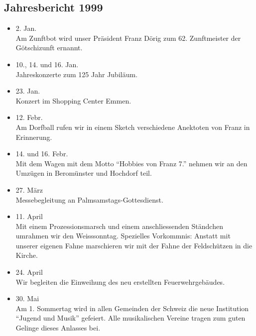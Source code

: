 \subsection{Jahresbericht 1999}

\begin{history}


    \begin{itemize}

        \item[]2. Jan.\\
        Am Zunftbot wird unser Präsident Franz Dörig zum 62. Zunftmeister der
        Götschizunft ernannt.

        \item[]10., 14. und 16. Jan.\\
        Jahreskonzerte zum 125 Jahr Jubiläum.

        \item[]23. Jan.\\
        Konzert im Shopping Center Emmen.

        \item[]12. Febr.\\
        Am Dorfball rufen wir in einem Sketch verschiedene Anektoten von Franz
        in Erinnerung.

        \item[]14. und 16. Febr.\\
        Mit dem Wagen mit dem Motto \enquote{Hobbies von Franz 7.} nehmen wir an
        den Umzügen in Beromünster und Hochdorf teil.

        \item[]27. März\\
        Messebegleitung an Palmsamstags-Gottesdienst.

        \item[]11. April\\
        Mit einem Prozessionsmarsch und einem anschliessenden Ständchen umrahmen
        wir den Weisssonntag. Spezielles Vorkommnis: Anstatt mit unserer eigenen
        Fahne marschieren wir mit der Fahne der Feldschützen in die Kirche.

        \item[]24. April\\
        Wir begleiten die Einweihung des neu erstellten Feuerwehrgebäudes.

        \item[]30. Mai\\
        Am 1. Sommertag wird in allen Gemeinden der Schweiz die neue Institution
        \enquote{Jugend und Musik} gefeiert. Alle musikalischen Vereine tragen
        zum guten Gelinge dieses Anlasses bei.


\end{itemize}
\end{history}
